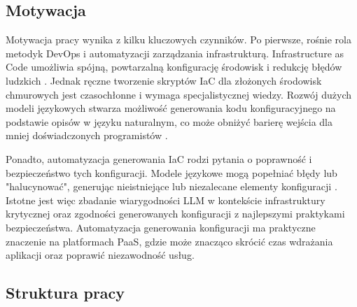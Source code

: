 \subsection{Motywacja}

Motywacja pracy wynika z kilku kluczowych czynników. Po pierwsze, rośnie rola metodyk DevOps i automatyzacji zarządzania infrastrukturą. Infrastructure as Code umożliwia spójną, powtarzalną konfigurację środowisk i redukcję błędów ludzkich \cite{low_repairing_2024}. Jednak ręczne tworzenie skryptów IaC dla złożonych środowisk chmurowych jest czasochłonne i wymaga specjalistycznej wiedzy. Rozwój dużych modeli językowych stwarza możliwość generowania kodu konfiguracyjnego na podstawie opisów w języku naturalnym, co może obniżyć barierę wejścia dla mniej doświadczonych programistów \cite{hu_repo2run_2025}.

Ponadto, automatyzacja generowania IaC rodzi pytania o poprawność i bezpieczeństwo tych konfiguracji. Modele językowe mogą popełniać błędy lub "halucynować", generując nieistniejące lub niezalecane elementy konfiguracji \cite{malul_genkubesec_2024}. Istotne jest więc zbadanie wiarygodności LLM w kontekście infrastruktury krytycznej oraz zgodności generowanych konfiguracji z najlepszymi praktykami bezpieczeństwa. Automatyzacja generowania konfiguracji ma praktyczne znaczenie na platformach PaaS, gdzie może znacząco skrócić czas wdrażania aplikacji oraz poprawić niezawodność usług.

\subsection{Struktura pracy}

